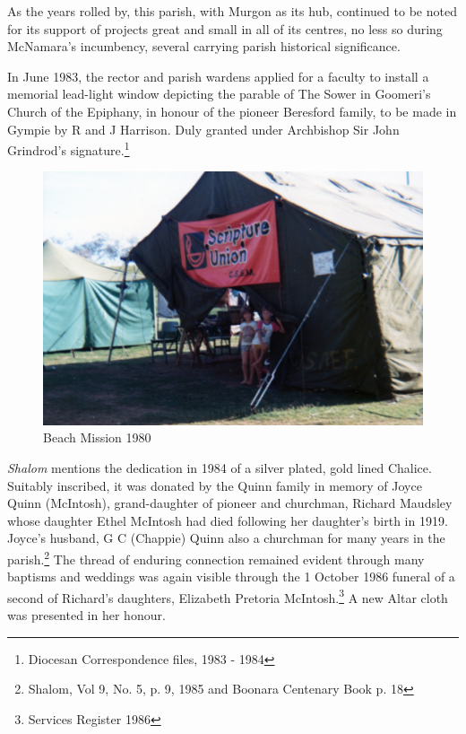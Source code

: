 As the years rolled by, this parish, with Murgon as its hub, continued to be noted for its support of projects great and small in all of its centres, no less so during McNamara's incumbency, several carrying parish historical significance.



In June 1983, the rector and parish wardens applied for a faculty to install a memorial lead-light window depicting the parable of The Sower in Goomeri's Church of the Epiphany, in honour of the pioneer Beresford family, to be made in Gympie by R and J Harrison. Duly granted under Archbishop Sir John Grindrod's signature.\footnote{Diocesan Correspondence files, 1983 - 1984}








\begin{figure}
\begin{center}
\includegraphics[width=1.\linewidth,center]{../images/beachMission1980.jpg}
\caption{Beach Mission 1980}
\end{center}
\end{figure}




\emph{Shalom} mentions the dedication in 1984 of a silver plated, gold lined Chalice. Suitably inscribed, it was donated by the Quinn family in memory of Joyce Quinn (McIntosh), grand-daughter of pioneer and churchman, Richard Maudsley whose daughter Ethel McIntosh had died following her daughter's birth in 1919. Joyce's husband, G C (Chappie) Quinn also a churchman for many years in the parish.\footnote{Shalom, Vol 9, No. 5, p. 9, 1985 and Boonara Centenary Book p. 18} The thread of enduring connection remained evident through many baptisms and weddings was again visible through the 1 October 1986 funeral of a second of Richard's daughters, Elizabeth Pretoria McIntosh.\footnote{Services Register 1986} A new Altar cloth was presented in her honour.


